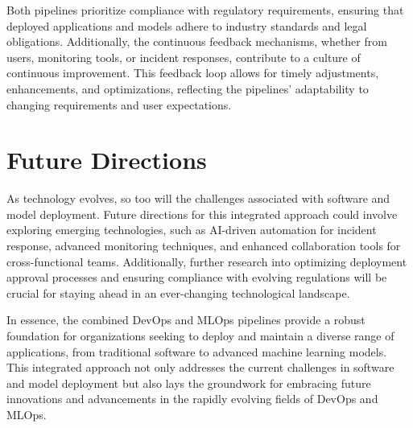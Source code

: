 \documentclass[12pt, letterpaper]{article}
\begin{document}
Both pipelines prioritize compliance with regulatory requirements, ensuring that deployed applications and models adhere to industry standards and legal obligations. Additionally, the continuous feedback mechanisms, whether from users, monitoring tools, or incident responses, contribute to a culture of continuous improvement. This feedback loop allows for timely adjustments, enhancements, and optimizations, reflecting the pipelines' adaptability to changing requirements and user expectations.

\section{Future Directions}

As technology evolves, so too will the challenges associated with software and model deployment. Future directions for this integrated approach could involve exploring emerging technologies, such as AI-driven automation for incident response, advanced monitoring techniques, and enhanced collaboration tools for cross-functional teams. Additionally, further research into optimizing deployment approval processes and ensuring compliance with evolving regulations will be crucial for staying ahead in an ever-changing technological landscape.

In essence, the combined DevOps and MLOps pipelines provide a robust foundation for organizations seeking to deploy and maintain a diverse range of applications, from traditional software to advanced machine learning models. This integrated approach not only addresses the current challenges in software and model deployment but also lays the groundwork for embracing future innovations and advancements in the rapidly evolving fields of DevOps and MLOps.

\end{document}
